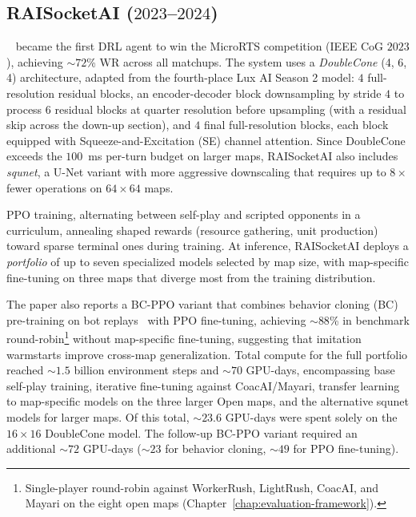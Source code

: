 \vspace{-0.2em}

\subsection{RAISocketAI ($2023$--$2024$)}
~\cite{goodfriendCompetitionWinningDeep2024} became the first DRL agent to win the MicroRTS competition (IEEE CoG $2023$), achieving ${\sim}72$\% $\mathrm{WR}$ across all matchups. The system uses a \emph{DoubleCone} (4, 6, 4) architecture, adapted from the fourth-place Lux AI Season 2 model: $4$ full-resolution residual blocks, an encoder-decoder block downsampling by stride $4$ to process $6$ residual blocks at quarter resolution before upsampling (with a residual skip across the down-up section), and $4$ final full-resolution blocks, each block equipped with Squeeze-and-Excitation (SE) channel attention. Since DoubleCone exceeds the $100$~ms per-turn budget on larger maps, RAISocketAI also includes \emph{squnet}, a U-Net variant with more aggressive downscaling that requires up to $8\times$ fewer operations on $64{\times}64$ maps.

PPO training, alternating between self-play and scripted opponents in a curriculum, annealing shaped rewards (resource gathering, unit production) toward sparse terminal ones during training. At inference, RAISocketAI deploys a \emph{portfolio} of up to seven specialized models selected by map size, with map-specific fine-tuning on three maps that diverge most from the training distribution.

The paper also reports a BC-PPO variant that combines behavior cloning (BC) pre-training on bot replays~\cite{ontanonExperimentsLearningUnitAction2016} with PPO fine-tuning, achieving ${\sim}88$\% in benchmark round-robin\footnote{Single-player round-robin against WorkerRush, LightRush, CoacAI, and Mayari on the eight open maps (Chapter~\ref{chap:evaluation-framework}).} without map-specific fine-tuning, suggesting that imitation warmstarts improve cross-map generalization. Total compute for the full portfolio reached ${\sim}1.5$ billion environment steps and ${\sim}70$ GPU-days, encompassing base self-play training, iterative fine-tuning against CoacAI/Mayari, transfer learning to map-specific models on the three larger Open maps, and the alternative squnet models for larger maps. Of this total, ${\sim}23.6$ GPU-days were spent solely on the $16{\times}16$ DoubleCone model. The follow-up BC-PPO variant required an additional ${\sim}72$ GPU-days (${\sim}23$ for behavior cloning, ${\sim}49$ for PPO fine-tuning).

